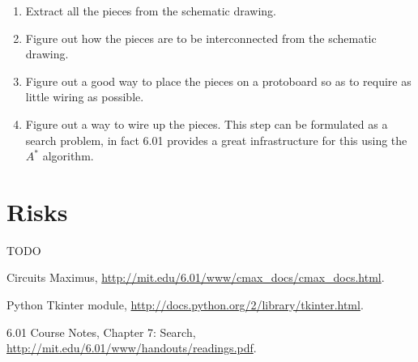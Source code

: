 \documentclass[12pt, doublespacing]{amsart}
\begin{document}
\begin{enumerate}
\item Extract all the pieces from the schematic drawing.
\item Figure out how the pieces are to be interconnected from the schematic drawing.
\item Figure out a good way to place the pieces on a protoboard so as to require as little wiring as possible.
\item Figure out a way to wire up the pieces. This step can be formulated as a search problem, in fact 6.01 provides a great infrastructure for this using the $A^*$ algorithm\cite{6.01search}.
\end{enumerate}

\section{Risks}
\label{sec:risks}
TODO

\begin{thebibliography}{9}

Circuits Maximus,
\url{http://mit.edu/6.01/www/cmax_docs/cmax_docs.html}.

Python Tkinter module, \url{http://docs.python.org/2/library/tkinter.html}.

6.01 Course Notes, Chapter 7: Search, \url{http://mit.edu/6.01/www/handouts/readings.pdf}.

\end{thebibliography}
\end{document}
